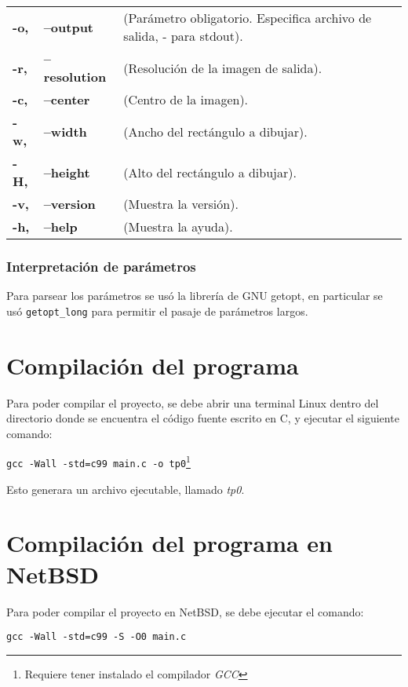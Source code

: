 \documentclass[a4paper,10pt,oneside]{article}
\begin{document}
\begin{ttfamily}
\begin{tabular}{lll}

\bf{-o,} & \bf{--output} &(Parámetro obligatorio. Especifica archivo de salida, - para stdout). \\
\bf{-r,} & \bf{--resolution} &(Resolución de la imagen de salida).\\
\bf{-c,} & \bf{--center} &(Centro de la imagen).\\
\bf{-w,} & \bf{--width} &(Ancho del rectángulo a dibujar).\\
\bf{-H,} & \bf{--height} &(Alto del rectángulo a dibujar).\\
\bf{-v,} & \bf{--version} 	&(Muestra la versión).\\
\bf{-h,} & \bf{--help} &(Muestra la ayuda).\\
\end{tabular}
\end{ttfamily}

\subsubsection{Interpretación de parámetros}
Para parsear los parámetros se usó la librería de GNU getopt, en particular se usó \texttt{getopt\_long} para permitir el pasaje de parámetros largos.
			
	\section{Compilación del programa}
	
	Para poder compilar el proyecto, se debe abrir una terminal Linux dentro del directorio donde se encuentra el código 
	fuente escrito en C, y ejecutar el siguiente comando:
	\begin{center}
	\texttt{gcc -Wall -std=c99  main.c -o tp0}\footnote{Requiere tener instalado el compilador \it{GCC}} 
	\end{center}
		
	 Esto generara un archivo ejecutable, llamado \textit{tp0}.

	\section{Compilación del programa en NetBSD}
	
	Para poder compilar el proyecto en NetBSD, se debe ejecutar el comando:
	
	\begin{center}
	\texttt{gcc -Wall -std=c99 -S -O0 main.c} 
	\end{center}
	
\end{document}
